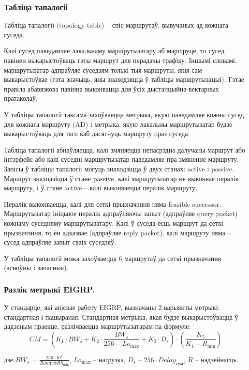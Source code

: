 \subsubsection{Табліца тапалогіі}

Табліца тапалогіі (topology table) -- спіс маршрутаў, вывучаных ад кожнага суседа.

Калі сусед паведамляе лакальнаму маршрутызатару аб маршруце, то сусед павінен выкарыстоўваць гэты маршрут для перадачы трафіку. Іншымі словамі, маршрутызатар адпраўляе суседзям толькі тыя маршруты, якія сам выкарыстоўвае (гэта значыць, яны знаходзяцца ў табліцы маршрутызацыі).
Гэтае правіла абавязкова павінна выконвацца для ўсіх дыстанцыйна-вектарных пратаколаў.

У табліцы тапалогіі таксама захоўваецца метрыка, якую паведамляе кожны сусед для кожнага маршруту (AD) і метрыка, якую лакальны маршрутызатар будзе выкарыстоўваць для таго каб дасягнуць маршруту праз суседа.

Табліца тапалогіі абнаўляецца, калі змяняецца непасрэдна далучаны маршрут або інтэрфейс або калі суседні маршрутызатар паведамляе пра змяненне маршруту.
Запісы ў табліцы тапалогіі могуць знаходзіцца ў двух станах: active і passive.
Маршрут знаходзіцца ў стане passive, калі маршрутызатар не выконвае пералік маршруту, і ў стане active -- калі выконваецца пералік маршруту.

Пералік выконваецца, калі для сеткі прызначэння няма feasible successor. Маршрутызатар ініцыюе пералік адпраўляючы запыт (адпраўляе query packet) кожнаму суседняму маршрутызатару. Калі ў суседа ёсць маршрут да сеткі прызначэння, то ён адказвае (адпраўляе reply packet), калі маршруту няма -- сусед адпраўляе запыт сваіх суседзяў.

У табліцы тапалогіі можа захоўваецца 6 маршрутаў да сеткі прызначэння (асноўны і запасныя).

\subsubsection{Разлік метрыкі EIGRP.}

У стандарце, які апісвае работу EIGRP, вызначаны 2 варыянты метрыкі:
стандартная і пашыраная. Стандартная метрыка, якая будзе выкарыстоўвацца ў дадзеным праекце, разлічваецца маршрутызатарам
па формуле:
\begin{equation}
    CM = \left(K_1 \cdot BW_s + K_2 \cdot \frac{BW_s}{256 -Lo_\text{max}} + K_3 \cdot D_s\right) \cdot \left(\frac{K_5}{K_4 + R_\text{min}}\right)
\end{equation}
\begin{Explanation}
    \item[дзе] $BW_s$ = $\frac{256 \cdot 10^7}{Bandwidth_\text{min}}$,
    $Lo_\text{max}$ -- нагрузка,
    $D_s$ -- $256 \cdot Delay_\text{сум}$,
    $R$ -- надзейнасць.
\end{Explanation}

